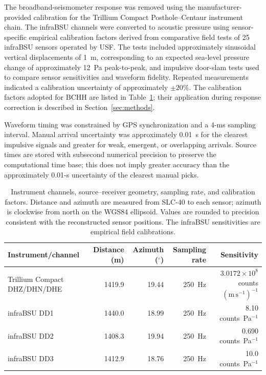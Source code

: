 \documentclass[]{seismica}
\begin{document}
The broadband-seismometer response was removed using the manufacturer-provided
calibration for the Trillium Compact Posthole--Centaur instrument chain.
The infraBSU channels were converted to acoustic pressure using
sensor-specific empirical calibration factors derived from comparative field
tests of 25 infraBSU sensors operated by USF. The tests included approximately
sinusoidal vertical displacements of 1~m, corresponding to an expected
sea-level pressure change of approximately 12~Pa peak-to-peak, and impulsive
door-slam tests used to compare sensor sensitivities and waveform fidelity.
Repeated measurements indicated a calibration uncertainty of approximately
$\pm20\%$. The calibration factors adopted for BCHH are listed in
Table~\ref{tab:instrument_calibration}; their application during response
correction is described in Section~\ref{sec:methods}.

Waveform timing was constrained by GPS synchronization and a 4-ms sampling
interval. Manual arrival uncertainty was approximately 0.01~s for the clearest
impulsive signals and greater for weak, emergent, or overlapping arrivals.
Source times are stored with subsecond numerical precision to preserve the
computational time base; this does not imply greater accuracy than the
approximately 0.01-s uncertainty of the clearest manual picks.

\begin{table}[t]
\centering
\caption{Instrument channels, source--receiver geometry, sampling rate, and
calibration factors. Distance and azimuth are measured from SLC-40 to each
sensor; azimuth is clockwise from north on the WGS84 ellipsoid. Values are
rounded to precision consistent with the reconstructed sensor positions. The
infraBSU sensitivities are empirical field calibrations.}
\label{tab:instrument_calibration}
\begin{tabular}{lrrrr}
\hline
Instrument/channel & Distance (m) & Azimuth ($^\circ$) & Sampling rate & Sensitivity \\
\hline
Trillium Compact DHZ/DHN/DHE
  & 1419.9 & 19.44 & 250~Hz
  & $3.0172\times10^8$ counts $(\mathrm{m\,s^{-1}})^{-1}$ \\
infraBSU DD1
  & 1440.0 & 18.99 & 250~Hz
  & 8.10 counts~Pa$^{-1}$ \\
infraBSU DD2
  & 1408.3 & 19.94 & 250~Hz
  & 0.690 counts~Pa$^{-1}$ \\
infraBSU DD3
  & 1412.9 & 18.76 & 250~Hz
  & 10.0 counts~Pa$^{-1}$ \\
\hline
\end{tabular}
\end{table}
\end{document}
